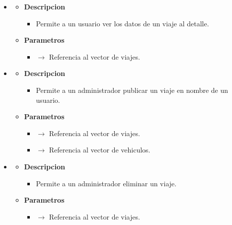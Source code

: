 \begin{itemize}
\begin{itemize}
\begin{itemize}
		\end{itemize}
	\end{itemize}
    \item \label{detallavi}
    \begin{itemize}
        \item \textbf{Descripcion}
        \begin{itemize}
			\item  Permite a un usuario ver los datos de un viaje al detalle.
		\end{itemize}
		\item \textbf{Parametros}
		\begin{itemize}
			\item {}  $\rightarrow$ Referencia al vector de viajes.
		\end{itemize}
	\end{itemize}
    \newpage
    \item \label{puviadmin}
    \begin{itemize}
        \item \textbf{Descripcion}
        \begin{itemize}
			\item Permite a un administrador publicar un viaje en nombre de un usuario.
		\end{itemize}
		\item \textbf{Parametros}
		\begin{itemize}
			\item {}  $\rightarrow$ Referencia al vector de viajes.
            \item {} $\rightarrow$ Referencia al vector de vehiculos.
		\end{itemize}
	\end{itemize}
    \item \label{delviadmin}
    \begin{itemize}
        \item \textbf{Descripcion}
        \begin{itemize}
			\item  Permite a un administrador eliminar un viaje.
		\end{itemize}
		\item \textbf{Parametros}
		\begin{itemize}
			\item {}  $\rightarrow$ Referencia al vector de viajes.
		\end{itemize}

\end{itemize}
\end{itemize}

